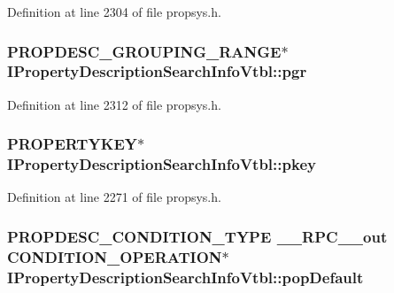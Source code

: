 Definition at line 2304 of file propsys.\+h.

\subsubsection[{\texorpdfstring{pgr}{pgr}}]{ {\bf P\+R\+O\+P\+D\+E\+S\+C\+\_\+\+G\+R\+O\+U\+P\+I\+N\+G\+\_\+\+R\+A\+N\+GE}$\ast$ I\+Property\+Description\+Search\+Info\+Vtbl\+::pgr}\hypertarget{struct_i_property_description_search_info_vtbl_aab707ca3b6c3db73c9e98aaecb9b407a}{}\label{struct_i_property_description_search_info_vtbl_aab707ca3b6c3db73c9e98aaecb9b407a}


Definition at line 2312 of file propsys.\+h.

\subsubsection[{\texorpdfstring{pkey}{pkey}}]{ {\bf P\+R\+O\+P\+E\+R\+T\+Y\+K\+EY}$\ast$ I\+Property\+Description\+Search\+Info\+Vtbl\+::pkey}\hypertarget{struct_i_property_description_search_info_vtbl_a9a62310b17c647a9904a12b34d7c6f66}{}\label{struct_i_property_description_search_info_vtbl_a9a62310b17c647a9904a12b34d7c6f66}


Definition at line 2271 of file propsys.\+h.

\subsubsection[{\texorpdfstring{pop\+Default}{popDefault}}]{ {\bf P\+R\+O\+P\+D\+E\+S\+C\+\_\+\+C\+O\+N\+D\+I\+T\+I\+O\+N\+\_\+\+T\+Y\+PE} {\bf \+\_\+\+\_\+\+R\+P\+C\+\_\+\+\_\+out} {\bf C\+O\+N\+D\+I\+T\+I\+O\+N\+\_\+\+O\+P\+E\+R\+A\+T\+I\+ON}$\ast$ I\+Property\+Description\+Search\+Info\+Vtbl\+::pop\+Default}\hypertarget{struct_i_property_description_search_info_vtbl_aeb7a05a7ce63f1aea405bb6fee01f422}{}\label{struct_i_property_description_search_info_vtbl_aeb7a05a7ce63f1aea405bb6fee01f422}


